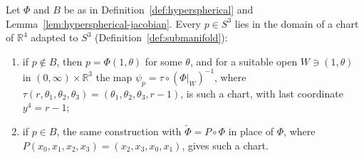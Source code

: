 \documentclass[11pt]{report}
\makeatletter
\newcounter{thmcounter}[section]
\newcommand{\thmlabel}[1]{\edef\@currentlabel{\arabic{section}.\arabic{thmcounter}}\label{#1}}
\makeatother
\begin{document}
\begin{propbox}\thmlabel{prop:hyperspherical-charts}
Let $\Phi$ and $B$ be as in Definition~\ref{def:hyperspherical} and Lemma~\ref{lem:hyperspherical-jacobian}. Every $p \in S^3$ lies in the domain of a chart of $\mathbb{R}^4$ adapted to $S^3$ (Definition~\ref{def:submanifold}):
\begin{enumerate}
    \item if $p \notin B$, then $p = \Phi(1, \theta)$ for some $\theta$, and for a suitable open $W \ni (1, \theta)$ in $(0, \infty) \times \mathbb{R}^3$ the map $\psi_p = \tau \circ (\Phi|_W)^{-1}$, where $\tau(r, \theta_1, \theta_2, \theta_3) = (\theta_1, \theta_2, \theta_3, r - 1)$, is such a chart, with last coordinate $y^4 = r - 1$;
    \item if $p \in B$, the same construction with $\tilde\Phi = P \circ \Phi$ in place of $\Phi$, where $P(x_0, x_1, x_2, x_3) = (x_2, x_3, x_0, x_1)$, gives such a chart.
\end{enumerate}
\end{propbox}
\end{document}

